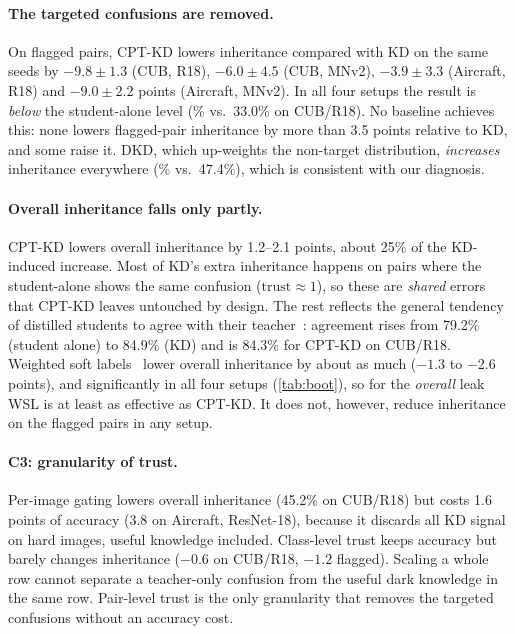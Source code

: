 \documentclass[10pt,twocolumn,letterpaper]{article}
\newcommand{\trust}{\mathrm{trust}}
\begin{document}
\paragraph{The targeted confusions are removed.} On flagged pairs, CPT-KD lowers inheritance compared with KD on the same seeds by $-9.8\pm1.3$ (CUB, R18), $-6.0\pm4.5$ (CUB, MNv2), $-3.9\pm3.3$ (Aircraft, R18) and $-9.0\pm2.2$ points (Aircraft, MNv2). In all four setups the result is \emph{below} the student-alone level (\% vs.\ 33.0\% on CUB/R18). No baseline achieves this: none lowers flagged-pair inheritance by more than 3.5 points relative to KD, and some raise it. DKD, which up-weights the non-target distribution, \emph{increases} inheritance everywhere (\% vs.\ 47.4\%), which is consistent with our diagnosis.

\paragraph{Overall inheritance falls only partly.} CPT-KD lowers overall inheritance by 1.2--2.1 points, about 25\% of the KD-induced increase. Most of KD's extra inheritance happens on pairs where the student-alone shows the same confusion ($\trust\approx1$), so these are \emph{shared} errors that CPT-KD leaves untouched by design. The rest reflects the general tendency of distilled students to agree with their teacher~\cite{stanton2021does}: agreement rises from 79.2\% (student alone) to 84.9\% (KD) and is 84.3\% for CPT-KD on CUB/R18. Weighted soft labels~\cite{zhou2021wsl} lower overall inheritance by about as much ($-1.3$ to $-2.6$ points), and significantly in all four setups (\cref{tab:boot}), so for the \emph{overall} leak WSL is at least as effective as CPT-KD. It does not, however, reduce inheritance on the flagged pairs in any setup.

\paragraph{C3: granularity of trust.} Per-image gating lowers overall inheritance (45.2\% on CUB/R18) but costs 1.6 points of accuracy (3.8 on Aircraft, ResNet-18), because it discards all KD signal on hard images, useful knowledge included. Class-level trust keeps accuracy but barely changes inheritance ($-0.6$ on CUB/R18, $-1.2$ flagged). Scaling a whole row cannot separate a teacher-only confusion from the useful dark knowledge in the same row. Pair-level trust is the only granularity that removes the targeted confusions without an accuracy cost.
\end{document}
